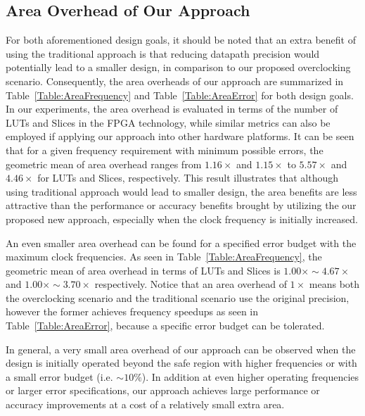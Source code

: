 \documentclass[prodmode,acmtrets]{acmsmall} %
\begin{document}
\subsection{Area Overhead of Our Approach}
For both aforementioned design goals, it should be noted that an extra benefit of using the traditional approach is that reducing datapath precision would potentially lead to a smaller design, in comparison to our proposed overclocking scenario. Consequently, the area overheads of our approach are summarized in Table~\ref{Table:AreaFrequency} and Table~\ref{Table:AreaError} for both design goals. In our experiments, the area overhead is evaluated in terms of the number of LUTs and Slices in the FPGA technology, while similar metrics can also be employed if applying our approach into other hardware platforms. It can be seen that for a given frequency requirement with minimum possible errors, the geometric mean of area overhead ranges from $1.16\times$ and $1.15\times$ to $5.57\times$ and $4.46\times$ for LUTs and Slices, respectively. This result illustrates that although using traditional approach would lead to smaller design, the area benefits are less attractive than the performance or accuracy benefits brought by utilizing the our proposed new approach, especially when the clock frequency is initially increased.

An even smaller area overhead can be found for a specified error budget with the maximum clock frequencies. As seen in Table~\ref{Table:AreaFrequency}, the geometric mean of area overhead in terms of LUTs and Slices is $1.00\times\sim4.67\times$ and $1.00\times\sim3.70\times$ respectively. Notice that an area overhead of $1\times$ means both the overclocking scenario and the traditional scenario use the original precision, however the former achieves frequency speedups as seen in Table~\ref{Table:AreaError}, because a specific error budget can be tolerated.


In general, a very small area overhead of our approach can be observed when the design is initially operated beyond the safe region with higher frequencies or with a small error budget (i.e. $\sim10\%$). In addition at even higher operating frequencies or larger error specifications, our approach achieves large performance or accuracy improvements at a cost of a relatively small extra area.
\end{document}
